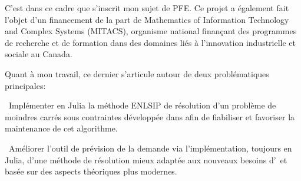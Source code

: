  C'est dans ce cadre que s'inscrit mon sujet de PFE. 
Ce projet a également fait l'objet d'un financement de la part de Mathematics of Information Technology and Complex Systems (MITACS), organisme national 
 finan\c cant des programmes de recherche et de formation dans des domaines liés à l'innovation industrielle et sociale au Canada. 

 Quant à mon travail, ce dernier s'articule autour de deux problématiques principales:

\begin{description}
\item
  \textbullet\ Implémenter en Julia la méthode ENLSIP de résolution d'un problème de moindres carrés sous contraintes développée dans 
 afin de fiabiliser et favoriser la maintenance de cet algorithme.
\item
  \textbullet\ Améliorer l'outil de prévision de la demande via l'implémentation, toujours en Julia, d'une méthode de 
  résolution mieux adaptée aux nouveaux besoins d'\HQ\ et basée sur des aspects théoriques plus modernes.
\end{description}


